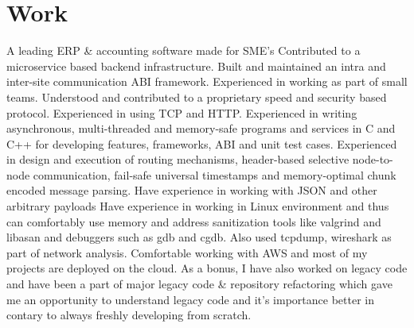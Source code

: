 \documentclass{resume_v01}
\begin{document}
\medskip

\bigskip

\section{Work}


\par {A leading ERP \& accounting software made for SME's}
\medskip
\workitems
{Contributed to a microservice based backend infrastructure. Built and maintained an intra and inter-site communication ABI framework. Experienced in working as part of small teams. Understood and contributed to a proprietary speed and security based protocol. Experienced in using TCP and HTTP.}
{Experienced in writing asynchronous, multi-threaded and memory-safe programs and services in C and C++ for developing features, frameworks, ABI and unit test cases. Experienced in design and execution of routing mechanisms, header-based selective node-to-node communication, fail-safe universal timestamps and memory-optimal chunk encoded message parsing. Have experience in working with JSON and other arbitrary payloads}
{Have experience in working in Linux environment and thus can comfortably use memory and address sanitization tools like valgrind and libasan and debuggers such as gdb and cgdb. Also used tcpdump, wireshark as part of network analysis. Comfortable working with AWS and most of my projects are deployed on the cloud.}
{As a bonus, I have also worked on legacy code and have been a part of major legacy code \& repository refactoring which gave me an opportunity to understand legacy code and it's importance better in contary to always freshly developing from scratch.}
\end{document}
